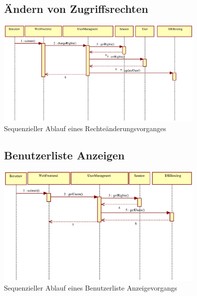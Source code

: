 \documentclass[a4paper,11pt]{scrartcl}
\begin{document}
\begin{figure}[h]
\subsection{Ändern von Zugriffsrechten}
		\centering
		\includegraphics[width=0.90\textwidth]{images/seq07_KontoRechteAendern.eps}
		\caption{Sequenzieller Ablauf eines Rechteänderungsvorganges}
		\label{seq07}
\end{figure}


\begin{figure}[h]
\subsection{Benutzerliste Anzeigen}
		\centering
		\includegraphics[width=0.90\textwidth]{images/seq08_benutzerlisteAnzeigen.eps}
		\caption{Sequenzieller Ablauf eines Benutzerliste Anzeigevorgangs}
		\label{seq08}
\end{figure}
\end{document}
